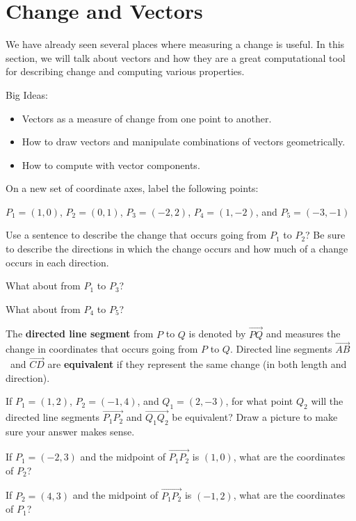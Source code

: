 \section{Change and Vectors}

We have already seen several places where measuring a change is useful. In this section, we will talk about vectors and how they are a great computational tool for describing change and computing various properties.

Big Ideas:
\begin{itemize}
\item Vectors as a measure of change from one point to another.
\item How to draw vectors and manipulate combinations of vectors geometrically.
\item How to compute with vector components.
\end{itemize}

\bq \be \item On a new set of coordinate axes, label the following points:

$P_1=(1,0)$, $P_2=(0,1)$, $P_3=(-2,2)$, $P_4=(1,-2)$, and  $P_5=(-3,-1)$

\item Use a sentence to describe the change that occurs going from $P_1$ to $P_2$? Be sure to describe the directions in which the change occurs and how much of a change occurs in each direction.
\item What about from $P_1$ to $P_3$?
\item What about from $P_4$ to $P_5$?
\ee \eq

\begin{info} The \textbf{directed line segment} from $P$ to $Q$ is denoted by $\overrightarrow{PQ}$ and measures the change in coordinates that occurs going from $P$ to $Q$. Directed line segments $\overrightarrow{AB}$  and $\overrightarrow{CD}$ are \textbf{equivalent} if they represent the same change (in both length  and direction). \end{info}

\bq If $P_1=(1,2)$, $P_2=(-1,4)$, and $Q_1=(2,-3)$, for what point $Q_2$ will the directed line segments $\overrightarrow{P_1 P_2}$ and $\overrightarrow{Q_1 Q_2}$ be equivalent? Draw a picture to make sure your answer makes sense.
\eq

\bq If $P_1=(-2,3)$ and the midpoint of $\overrightarrow{P_1 P_2}$ is $(1,0)$, what are the coordinates of $P_2$?
\eq

\bq If $P_2=(4,3)$ and the midpoint of $\overrightarrow{P_1 P_2}$ is $(-1,2)$, what are the coordinates of $P_1$?
\eq


